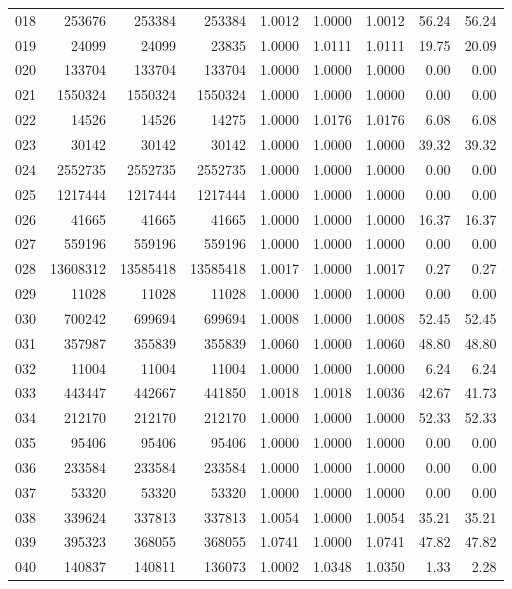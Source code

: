 \begin{longtable}{crrrrrrrr}
018 & 253676 & 253384 & 253384 & 1.0012 & 1.0000 & 1.0012 & 56.24 & 56.24 \\
019 & 24099 & 24099 & 23835 & 1.0000 & 1.0111 & 1.0111 & 19.75 & 20.09 \\
020 & 133704 & 133704 & 133704 & 1.0000 & 1.0000 & 1.0000 & 0.00 & 0.00 \\
021 & 1550324 & 1550324 & 1550324 & 1.0000 & 1.0000 & 1.0000 & 0.00 & 0.00 \\
022 & 14526 & 14526 & 14275 & 1.0000 & 1.0176 & 1.0176 & 6.08 & 6.08 \\
023 & 30142 & 30142 & 30142 & 1.0000 & 1.0000 & 1.0000 & 39.32 & 39.32 \\
024 & 2552735 & 2552735 & 2552735 & 1.0000 & 1.0000 & 1.0000 & 0.00 & 0.00 \\
025 & 1217444 & 1217444 & 1217444 & 1.0000 & 1.0000 & 1.0000 & 0.00 & 0.00 \\
026 & 41665 & 41665 & 41665 & 1.0000 & 1.0000 & 1.0000 & 16.37 & 16.37 \\
027 & 559196 & 559196 & 559196 & 1.0000 & 1.0000 & 1.0000 & 0.00 & 0.00 \\
028 & 13608312 & 13585418 & 13585418 & 1.0017 & 1.0000 & 1.0017 & 0.27 & 0.27 \\
029 & 11028 & 11028 & 11028 & 1.0000 & 1.0000 & 1.0000 & 0.00 & 0.00 \\
030 & 700242 & 699694 & 699694 & 1.0008 & 1.0000 & 1.0008 & 52.45 & 52.45 \\
031 & 357987 & 355839 & 355839 & 1.0060 & 1.0000 & 1.0060 & 48.80 & 48.80 \\
032 & 11004 & 11004 & 11004 & 1.0000 & 1.0000 & 1.0000 & 6.24 & 6.24 \\
033 & 443447 & 442667 & 441850 & 1.0018 & 1.0018 & 1.0036 & 42.67 & 41.73 \\
034 & 212170 & 212170 & 212170 & 1.0000 & 1.0000 & 1.0000 & 52.33 & 52.33 \\
035 & 95406 & 95406 & 95406 & 1.0000 & 1.0000 & 1.0000 & 0.00 & 0.00 \\
036 & 233584 & 233584 & 233584 & 1.0000 & 1.0000 & 1.0000 & 0.00 & 0.00 \\
037 & 53320 & 53320 & 53320 & 1.0000 & 1.0000 & 1.0000 & 0.00 & 0.00 \\
038 & 339624 & 337813 & 337813 & 1.0054 & 1.0000 & 1.0054 & 35.21 & 35.21 \\
039 & 395323 & 368055 & 368055 & 1.0741 & 1.0000 & 1.0741 & 47.82 & 47.82 \\
040 & 140837 & 140811 & 136073 & 1.0002 & 1.0348 & 1.0350 & 1.33 & 2.28 \\

\end{longtable}
